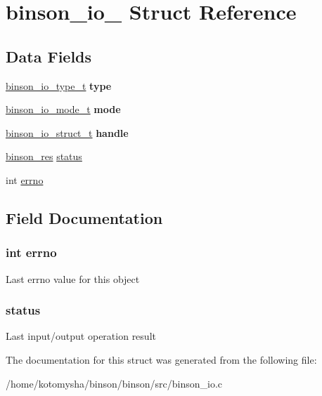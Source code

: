 \hypertarget{structbinson__io__}{\section{binson\-\_\-io\-\_\- Struct Reference}
\label{structbinson__io__}
}
\subsection*{Data Fields}
\begin{DoxyCompactItemize}
\item 
\hypertarget{structbinson__io___ae718a26679ca5d334f1b7d8d48114068}{\hyperlink{binson__io_8h_aae753a8dc006f2ef2dfae8bcac7547cc}{binson\-\_\-io\-\_\-type\-\_\-t} {\bfseries type}}\label{structbinson__io___ae718a26679ca5d334f1b7d8d48114068}

\item 
\hypertarget{structbinson__io___acef0870ae524fcd5fcfeb295ec6ecabb}{\hyperlink{binson__io_8h_a7c3648c1c633ffbe723b91c04713f2c0}{binson\-\_\-io\-\_\-mode\-\_\-t} {\bfseries mode}}\label{structbinson__io___acef0870ae524fcd5fcfeb295ec6ecabb}

\item 
\hypertarget{structbinson__io___a83b4d5537873e468f33aedf2f8faa360}{\hyperlink{union__binson__io__struct__t}{binson\-\_\-io\-\_\-struct\-\_\-t} {\bfseries handle}}\label{structbinson__io___a83b4d5537873e468f33aedf2f8faa360}

\item 
\hyperlink{binson__error_8h_acd4f170ba20fd1c501b1aa5b8e9ca893}{binson\-\_\-res} \hyperlink{structbinson__io___a95182663cdcba116fc9470af934c6a40}{status}
\item 
int \hyperlink{structbinson__io___ad65a8842cc674e3ddf69355898c0ecbf}{errno}
\end{DoxyCompactItemize}


\subsection{Field Documentation}
\hypertarget{structbinson__io___ad65a8842cc674e3ddf69355898c0ecbf}{
\subsubsection[{errno}]{\setlength{\rightskip}{0pt plus 5cm}int errno}}\label{structbinson__io___ad65a8842cc674e3ddf69355898c0ecbf}
Last errno value for this object \hypertarget{structbinson__io___a95182663cdcba116fc9470af934c6a40}{
\subsubsection[{status}]{ status}}\label{structbinson__io___a95182663cdcba116fc9470af934c6a40}
Last input/output operation result 

The documentation for this struct was generated from the following file\-:\begin{DoxyCompactItemize}
\item 
/home/kotomysha/binson/binson/src/binson\-\_\-io.\-c\end{DoxyCompactItemize}
